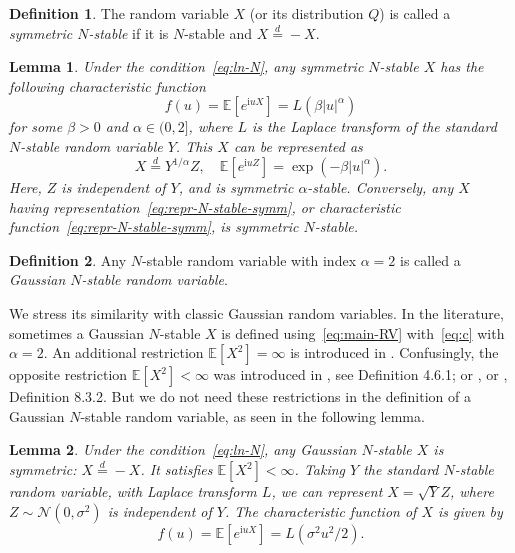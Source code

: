\documentclass[12pt]{amsart}
\newtheorem{lemma}{Lemma}[section]
\theoremstyle{remark}
\theoremstyle{definition}
\newtheorem{definition}{Definition}[section]
\begin{document}
\begin{definition} The random variable $X$ (or its distribution $Q$) is called a {\it symmetric $N$-stable} if it is $N$-stable and $X \stackrel{d}{=} -X$. 
\end{definition}

\begin{lemma} Under the condition~\eqref{eq:ln-N}, any symmetric $N$-stable $X$ has the following characteristic function 
\begin{equation}
\label{eq:ChF-stable-symm}
f(u) = \mathbb E\left[e^{\mathrm{i}uX}\right] = L(\beta |u|^{\alpha})
\end{equation}
for some $\beta > 0$ and $\alpha \in (0, 2]$, where $L$ is the Laplace transform of the standard $N$-stable random variable $Y$. This $X$ can be represented as 
\begin{equation}
\label{eq:repr-N-stable-symm}
X \stackrel{d}{=} Y^{1/\alpha}Z,\quad \mathbb E\left[e^{\mathrm{i}uZ}\right] = \exp\left(-\beta |u|^{\alpha}\right).
\end{equation}
Here, $Z$ is independent of $Y$, and is symmetric $\alpha$-stable. Conversely, any $X$ having representation~\eqref{eq:repr-N-stable-symm}, or characteristic function~\eqref{eq:repr-N-stable-symm}, is symmetric $N$-stable. 
\label{lemma:symmetry}
\end{lemma}

\begin{definition} Any $N$-stable random variable with index $\alpha = 2$ is called a {\it Gaussian $N$-stable random variable}.
\end{definition}

We stress its similarity with classic Gaussian random variables. In the literature, sometimes a Gaussian $N$-stable $X$ is defined using~\eqref{eq:main-RV} with~\eqref{eq:c} with $\alpha = 2$. An additional restriction 
$\mathbb E[X^2] = \infty$ is introduced in \cite[Definition 2]{Stable}. Confusingly, the opposite restriction $\mathbb E[X^2] < \infty$ was introduced in \cite[Chapter 4]{GnedenkoBook}, see Definition 4.6.1; or \cite[Definition 2]{Klebanov}, or \cite[Chapter 8]{KKRbook}, Definition 8.3.2. But we do not need these restrictions in the definition of a Gaussian $N$-stable random variable, as seen in the following lemma.

\begin{lemma} Under the condition~\eqref{eq:ln-N}, any Gaussian $N$-stable $X$ is symmetric: $X \stackrel{d}{=} -X$. It satisfies $\mathbb E[X^2] < \infty$. Taking $Y$ the standard $N$-stable random variable, with Laplace transform $L$, we can represent $X = \sqrt{Y}Z$, where $Z \sim \mathcal N(0, \sigma^2)$ is independent of $Y$. The characteristic function of $X$ is given by 
$$
f(u) = \mathbb E\left[e^{\mathrm{i}uX}\right] = L(\sigma^2u^2/2).
$$
\label{lemma:Gaussian}
\end{lemma}
\end{document}
